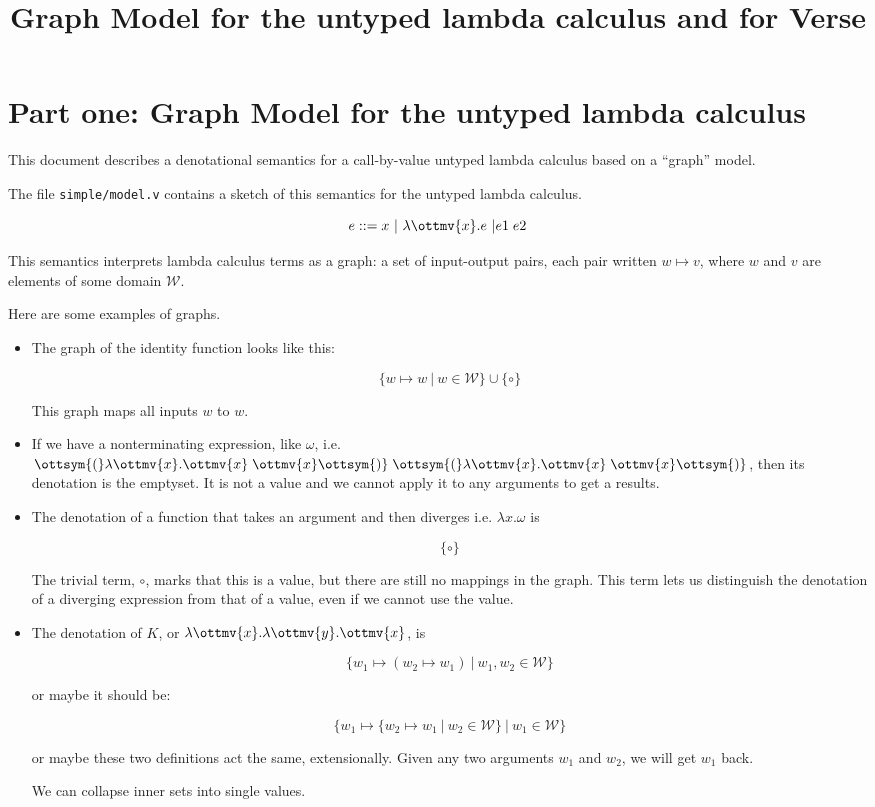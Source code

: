 \documentclass{article}
\title{Graph Model for the untyped lambda calculus and for 
Verse}
\theoremstyle{definition}
\begin{document}
\maketitle


\section{Part one: Graph Model for the untyped lambda calculus}

This document describes a denotational semantics for a
call-by-value untyped lambda calculus based on 
a ``graph'' model. 

The file \texttt{simple/model.v} contains a sketch of this semantics for the untyped lambda calculus. 

\[ e ::= x\ |\  \lambda  \ottmv{x}  .  e \ |  e1  \;  e2  \]

This semantics interprets lambda calculus terms as a graph: a set of
input-output pairs, each pair written $w \mapsto v$, where $w$ and $v$
are elements of some domain $\mathcal{W}$.


Here are some examples of graphs.

\begin{itemize}
\item The graph of the identity function looks like this:

\[ \{ w \mapsto w\ |\ w \in \mathcal{W} \} \cup \{ \circ \} \]

This graph maps all inputs $w$ to $w$. 

\item If we have a nonterminating expression, like $\omega$, i.e. 
  $ \ottsym{(}    \lambda  \ottmv{x}  .  \ottmv{x}   \;  \ottmv{x}   \ottsym{)}  \;  \ottsym{(}    \lambda  \ottmv{x}  .  \ottmv{x}   \;  \ottmv{x}   \ottsym{)} $, then its denotation is the emptyset.  It is not
  a value and we cannot apply it to any arguments to get a results.

\item The denotation of a function that takes an argument and then diverges
  i.e. $\lambda x. \omega$ is 

  \[ \{ \circ \} \]

  The trivial term, $\circ$, marks that this is a value, but there are still
  no mappings in the graph. This term lets us distinguish the denotation of a
  diverging expression from that of a value, even if we cannot use the value.

\item The denotation of $K$, or $ \lambda  \ottmv{x}  .   \lambda  \ottmv{y}  .  \ottmv{x}  $, is 

  \[ \{ w_1 \mapsto (w_2 \mapsto w_1)\ |\ w_1, w_2 \in \mathcal{W} \} \]

\noindent
or maybe it should be:

  \[ \{ w_1 \mapsto \{ w_2 \mapsto w_1\ |\ w_2 \in \mathcal{W} \}\ |\ w_1 \in \mathcal{W} \} \]

\noindent
  or maybe these two definitions act the same, extensionally. Given any two
  arguments $w_1$ and $w_2$, we will get $w_1$ back.

We can collapse inner sets into single values. 

\end{itemize}
\end{document}
